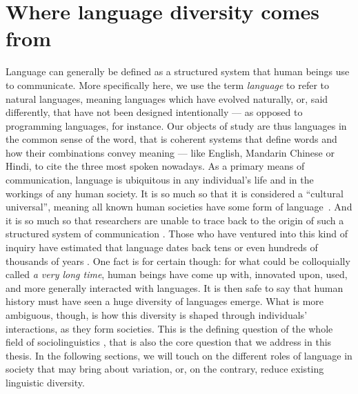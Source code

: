 \documentclass[../thesis.tex]{subfiles}
\begin{document}
\chapter{Where language diversity comes from}
\label{ch:origins_lang_diversity}

Language can generally be defined as
a structured system that human beings use to communicate.
More specifically here, we use the term \emph{language} to refer to natural languages, meaning languages which have evolved naturally, or, said differently, that have not been designed intentionally --- as opposed to programming languages, for instance. Our objects of
study are thus languages in the common sense of the word, that is coherent
systems that define words and how their combinations convey meaning --- like English, Mandarin Chinese or Hindi, to cite the three most spoken nowadays.
As
a primary means of communication, language
is ubiquitous in any individual's life and in the workings of any human
society. It is so much so that it is considered a ``cultural universal'', meaning all
known human societies have some form of
language~\cite{GreenbergLanguageUniversals2020,BrownDonaldHumanUniversals1991,}.
And it
is so much so that researchers are unable to trace back to the origin of such a
structured system of communication
\cite{MullerLectureIX1861,StamInquiriesOrigin1976,GibsonOxfordHandbook2011,HauserMysteryLanguage2014}.
Those who have ventured into this kind of inquiry have estimated that language dates back tens or even hundreds of
thousands of years
\cite{NicholsOriginDispersal1998,ChomskyLanguageMind2004,BothaCradleLanguage2009,DediuAntiquityLanguage2013}.
One fact is for certain though: for what could be colloquially called \emph{a very long
time}, human beings have come up with, innovated upon, used, and more generally
interacted with languages. It is then safe to say that human history must have seen a huge
diversity of languages emerge. What is more ambiguous, though, is how this diversity is
shaped through individuals' interactions, as they form societies. This is the defining question of the whole field of sociolinguistics \cite{LabovSociolinguisticPatterns1973,TrudgillSociolinguisticsIntroduction2000,ChambersSociolinguisticTheory2007,WardhaughIntroductionSociolinguistics2008,LabovPrinciplesLinguistic2001}, that is also the core question that we address in this thesis. In the following sections, we will
touch on the different roles of language in society that may bring about variation, or, on the contrary, reduce existing linguistic diversity.
\end{document}

